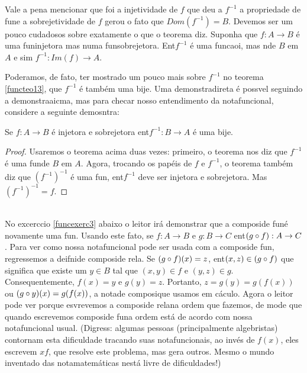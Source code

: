 Vale a pena mencionar que foi a injetividade de $f$ que deu a $f^{-1}$ a propriedade de fun\cao e a sobrejetividade de $f$ gerou o fato que $Dom(f^{-1})=B$. Devemos ser um pouco cudadosos sobre exatamente o que o teorema diz. Suponha que $f:A\to B$ \'e uma fun\cao injetora mas n\ao uma fun\cao sobrejetora. Ent\ao $f^{-1}$ \'e uma funcaoi, mas n\ao de $B$ em $A$ e sim $f^{-1}:Im(f)\to A$.

Poder\ih amos, de fato, ter mostrado um pouco mais sobre $f^{-1}$ no teorema \ref{functeo13}, que $f^{-1}$ \'e tamb\'em uma bije\caoi. Uma demonstra\cao direta \'e poss\ih vel seguindo a demonstra\cao aicma, mas para checar nosso entendimento da nota\cao funcional, considere a seguinte demosntra\caoi:
\begin{teob}\label{functeo14}
Se $f:A\to B$ \'e injetora e sobrejetora ent\ao $f^{-1}:B\to A$ \'e uma bije\caoi.
\end{teob}
\begin{proof}
Usaremos o teorema acima duas vezes: primeiro, o teorema nos diz que $f^{-1}$ \'e uma fun\cao de $B$ em $A$. Agora, trocando os pap\'eis de $f$ e $f^{-1}$, o teorema tamb\'em diz que $(f^{-1})^{-1}$ \'e uma fun\caoi, ent\ao $f^{-1}$ deve ser injetora e sobrejetora. Mas $(f^{-1})^{-1}=f$.
\end{proof}
\\

No excerc\ih cio \ref{funcexerc3} abaixo o leitor ir\'a demonstrar que a composi\cao de fun\coes \'e novamente uma fun\caoi. Usando este fato, se $f:A\to B$ e $g:B\to C$ ent\ao $(g\circ f):A\to C$. Para ver como nossa nota\cao funcional pode ser usada com a composi\cao de fun\cois, regressemos a deifni\cao de composi\cao de rela\cois. Se $(g\circ f)(x)=z$, ent\ao $(x,z)\in (g\circ f)$ que significa que existe um $y\in B$ tal que $(x,y)\in f$ e $(y,z)\in g$. Consequentemente, $f(x)=y$ e $g(y)=z$. Portanto, $z=g(y)=g(f(x))$ ou $(g\circ y)(x)=g(f(x))$, a nota\cao de composi\cao que usamos em c\'aculo. Agora o leitor pode ver porque esvrevemos a composi\cao de rela\coes na ordem que fazemos, de mode que quando escrevemos composi\cao de fun\coes a ordem est\'a de acordo com nossa nota\cao funcional usual. (Digress\aoi: algumas pessoas (principalmente algebristas) contornam esta dificuldade tracando suas nota\coes funcionais, ao inv\'es de $f(x)$, eles escrevem $xf$, que resolve este problema, mas gera outros. Mesmo o mundo inventado das nota\coes matem\'aticas n\ao est\'a livre de dificuldades!)

